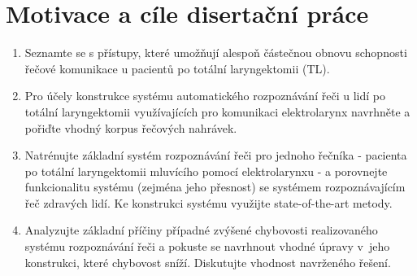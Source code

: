 \chapter{Motivace a cíle disertační práce}
\label{chap:mot}

\begin{enumerate}
  \item Seznamte se s přístupy, které umožňují alespoň částečnou obnovu schopnosti řečové komunikace u pacientů po totální laryngektomii (TL).
  \item Pro účely konstrukce systému automatického rozpoznávání řeči u lidí po totální laryngektomii využívajících pro komunikaci elektrolarynx navrhněte a pořiďte vhodný korpus řečových nahrávek.
  \item Natrénujte základní systém rozpoznávání řeči pro jednoho řečníka - pacienta po totální laryngektomii mluvícího pomocí elektrolarynxu - a porovnejte funkcionalitu systému (zejména jeho přesnost) se systémem rozpoznávajícím řeč zdravých lidí. Ke konstrukci systému využijte state-of-the-art metody.
  \item Analyzujte základní příčiny případné zvýšené chybovosti realizovaného systému rozpoznávání řeči a pokuste se navrhnout vhodné úpravy v~jeho konstrukci, které chybovost sníží. Diskutujte vhodnost navrženého řešení.
\end{enumerate}
